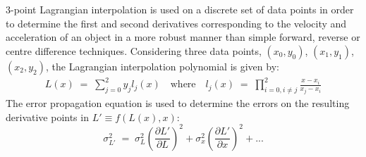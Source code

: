 \documentclass[namedreferences]{SolarPhysics}
\begin{document}
\begin{article}
3-point Lagrangian interpolation is used on a discrete set of data points in order to determine the first and second derivatives corresponding to the velocity and acceleration of an object in a more robust manner than simple forward, reverse or centre difference techniques. Considering three data points, $(x_0, y_0)$, $(x_1, y_1)$, $(x_2, y_2)$, the Lagrangian interpolation polynomial is given by:
\begin{eqnarray}
L(x) \; =\; \sum_{j=0}^2 y_j l_j(x) \quad \mbox{where} \quad
l_j(x) \; =\; \prod_{i=0, i\neq j}^2 \frac{x-x_i}{x_j-x_i} 
\end{eqnarray}
The error propagation equation is used to determine the errors on the resulting derivative points in $L' \equiv f(L(x),x)$:
\begin{equation}
\sigma_{L'}^2 \; = \; \sigma_L^2 \left(\frac{\partial L'}{\partial L}\right)^2 + \sigma_x^2\left(\frac{\partial L'}{\partial x}\right)^2+...
\end{equation}

\end{article}
\end{document}
